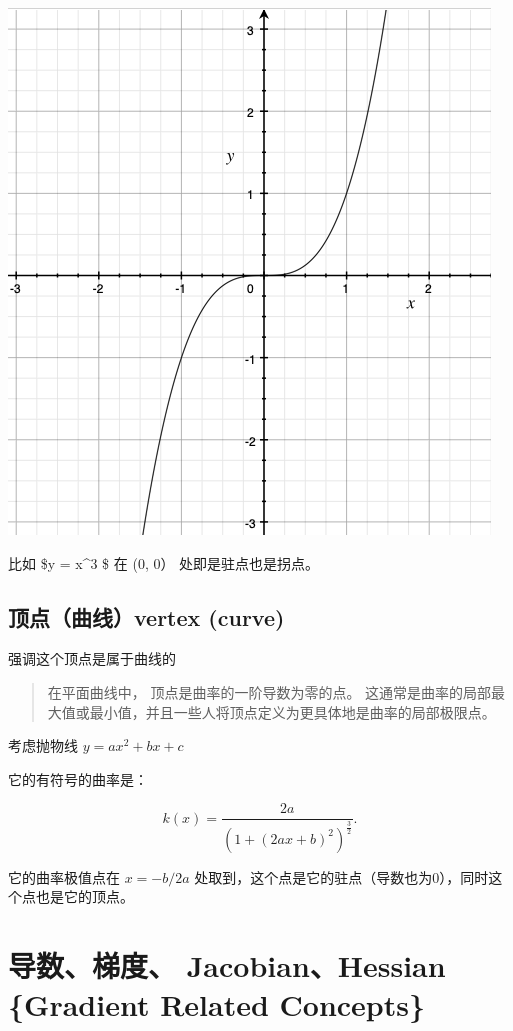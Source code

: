 \documentclass[
]{book}
\begin{document}
\includegraphics{images/y_cubic_x.png}

比如 \$y = x\^{}3 \$ 在 (0, 0） 处即是驻点也是拐点。

\hypertarget{ux9876ux70b9ux66f2ux7ebfvertex-curve}{%
\section{顶点（曲线）vertex (curve)}\label{ux9876ux70b9ux66f2ux7ebfvertex-curve}}

强调这个顶点是属于曲线的

\begin{quote}
在平面曲线中， 顶点是曲率的一阶导数为零的点。 这通常是曲率的局部最大值或最小值，并且一些人将顶点定义为更具体地是曲率的局部极限点。
\end{quote}

考虑抛物线 \(y = ax^2 + bx + c\)

它的有符号的曲率是：

\[{\displaystyle k(x)={\frac {2a}{\left(1+(2ax+b)^{2}\right)^{\frac {3}{2}}}}.}\]

它的曲率极值点在 \(x = -b/2a\) 处取到，这个点是它的驻点（导数也为0），同时这个点也是它的顶点。

\hypertarget{ux5bfcux6570ux68afux5ea6-jacobianhessian-gradient-related-concepts}{%
\chapter{导数、梯度、 Jacobian、Hessian \{Gradient Related Concepts\}}\label{ux5bfcux6570ux68afux5ea6-jacobianhessian-gradient-related-concepts}}
\end{document}
